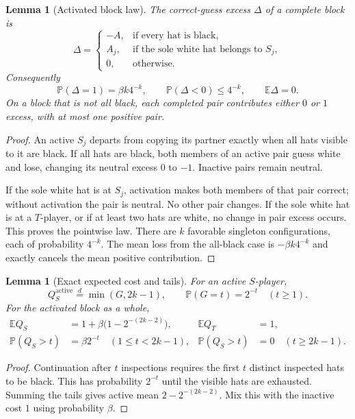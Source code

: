 \documentclass[11pt,letterpaper]{article}
\newtheorem{lemma}[theorem]{Lemma}
\theoremstyle{definition}
\newcommand{\E}{\mathbb E}
\newcommand{\Prb}{\mathbb P}
\begin{document}
\begin{lemma}[Activated block law]
\label{mbg:rnd:lem:block}
The correct-guess excess $\Delta$ of a complete block is
\begin{equation}
 \Delta=
 \begin{cases}
 -A,&\text{if every hat is black},\\
 A_j,&\text{if the sole white hat belongs to }S_j,\\
 0,&\text{otherwise}.
 \end{cases}
 \label{mbg:rnd:eq:block-law}
\end{equation}
Consequently
\begin{equation}
 \Prb(\Delta=1)=\beta k4^{-k},\qquad
 \Prb(\Delta<0)\le4^{-k},\qquad \E\Delta=0.
 \label{mbg:rnd:eq:block-probs}
\end{equation}
On a block that is not all black, each completed pair contributes
either $0$ or $1$ excess, with at most one positive pair.
\end{lemma}
\begin{proof}
An active $S_j$ departs from copying its partner exactly when all hats
visible to it are black. If all hats are black, both members of an
active pair guess white and lose, changing its neutral excess $0$ to
$-1$. Inactive pairs remain neutral.

If the sole white hat is at $S_j$, activation makes both members of
that pair correct; without activation the pair is neutral. No other
pair changes. If the sole white hat is at a $T$-player, or if at least
two hats are white, no change in pair excess occurs. This proves the
pointwise law. There are $k$ favorable singleton configurations, each
of probability $4^{-k}$. The mean loss from the all-black case is
$-\beta k4^{-k}$ and exactly cancels the mean positive contribution.
\end{proof}

\begin{lemma}[Exact expected cost and tails]
\label{mbg:rnd:lem:block-cost}
For an active $S$-player,
\[
 Q_S^{\mathrm{active}}\overset{d}=\min(G,2k-1),
 \qquad \Prb(G=t)=2^{-t}\quad(t\ge1).
\]
For the activated block as a whole,
\begin{align}
 \E Q_S&=1+\beta\bigl(1-2^{-(2k-2)}\bigr),&
 \E Q_T&=1,\label{mbg:rnd:eq:activated-cost}\\
 \Prb(Q_S>t)&=\beta2^{-t}\quad(1\le t<2k-1),&
 \Prb(Q_S>t)&=0\quad(t\ge2k-1).
 \label{mbg:rnd:eq:activated-tail}
\end{align}
\end{lemma}
\begin{proof}
Continuation after $t$ inspections requires the first $t$ distinct
inspected hats to be black. This has probability $2^{-t}$ until the
visible hats are exhausted. Summing the tails gives active mean
$2-2^{-(2k-2)}$. Mix this with the inactive cost $1$ using probability
$\beta$.
\end{proof}
\end{document}
